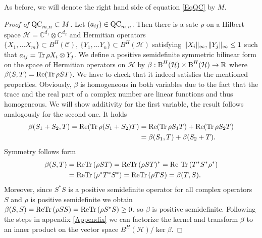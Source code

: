\noindent As before, we will denote the right hand side of equation \ref{EqQC} by $ M $.
\begin{proof}[Proof of $ \textup{QC}_{m,n} \subset M $]
	Let $ (a_{ij}) \in \textup{QC}_{m,n} $. Then there is a sate $ \rho $ on a Hilbert space $ \mathcal{H} = \mathbb{C}^{d_1} \otimes\mathbb{C}^{d_2} $ and Hermitian operators $ \{X_1,\hdots X_m\}\subset  B^H(\mathcal{C}), \, \{Y_1,\hdots Y_n\}\subset B^H(\mathcal{H}) $ satisfying $  \Vert {X_i} \Vert_{\infty},  \Vert {Y_j} \Vert_{\infty} \le 1 $ such that 
	$ a_{ij} = \textup{Tr} \, {\rho X_i \otimes Y_j}  $.
	We define a positive semidefinite symmetric bilinear form on the space of Hermitian operators on $ \mathcal{H} $ by 
	$ \beta: \textup{B}^{H}(\mathcal{H}) \times \textup{B}^{H}(\mathcal{H}) \to \mathbb{R} $ where $ \beta(S,T) =\textup{Re}( \textup{Tr} \, {\rho ST} ) $.
	We have to check that it indeed satisfies the mentioned properties. 
	Obviously, $ \beta $ is homogeneous in both variables due to the fact that the trace and the real part of a complex number are linear functions and thus homogeneous. We will show additivity for the first variable, the result follows analogously for the second one. It holds
	\begin{align*}
		\beta(S_1+S_2,T) = \textup{Re}(\textup{Tr} \, {\rho(S_1+S_2)T} ) &= \textup{Re}(\textup{Tr} \, {\rho S_1T} ) + \textup{Re}(\textup{Tr} \, {\rho S_2T} ) \\
		&= \beta(S_1,T)+ \beta(S_2+T).
	\end{align*}
	Symmetry follows form 
	\begin{align*}
		\beta(S,T)&= \textup{Re}\textup{Tr} \, {(\rho ST)}  =\textup{Re}\textup{Tr} \, {(\rho ST)^*}   = \textup{Re \ensuremath{\textup{Tr} \, {(T^*S^* \rho^*} })}  \\
		 &=\textup{Re} \textup{Tr} \, {(\rho^* T^*S^*)}  = \textup{Re} \textup{Tr} \, {(\rho T S)}  = \beta(T,S).
	\end{align*}
	Moreover, since $ S^*S $ is a positive semidefinite operator for all complex operators $ S $ and $  \rho $ is positive semidefinite we obtain $ \beta(S,S) = \textup{Re}\textup{Tr} \, {(\rho SS)}  = \textup{Re} \textup{Tr} \, {(\rho S^*S)}  \ge 0 $, so $ \beta $ is positive semidefinite. 
	Following the steps in appendix \ref{Appendix} we can factorize the kernel and transform $ \beta $ to an inner product on the vector space $ B^H(\mathcal{H})/ \ker{\beta} $. 
	

\end{proof}

